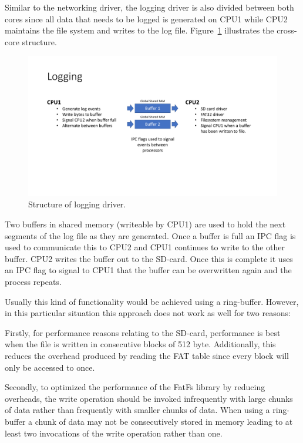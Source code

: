 Similar to the networking driver, the logging driver is also divided between both cores since all data that needs to be logged is generated on CPU1 while CPU2 maintains the file system and writes to the log file. Figure~\ref{fig:logging_structure} illustrates the cross-core structure.

\begin{figure}[H]
    \centering \includegraphics[width=1.0\textwidth]{./figures/logging_structure.pdf}
    \caption{Structure of logging driver.}
    \label{fig:logging_structure}
\end{figure}

Two buffers in shared memory (writeable by CPU1) are used to hold the next segments of the log file as they are generated. Once a buffer is full an IPC flag is used to communicate this to CPU2 and CPU1 continues to write to the other buffer. CPU2 writes the buffer out to the SD-card. Once this is complete it uses an IPC flag to signal to CPU1 that the buffer can be overwritten again and the process repeats.

Usually this kind of functionality would be achieved using a ring-buffer. However, in this particular situation this approach does not work as well for two reasons:

Firstly, for performance reasons relating to the SD-card, performance is best when the file is written in consecutive blocks of 512 byte. Additionally, this reduces the overhead produced by reading the FAT table since every block will only be accessed to once.

Secondly, to optimized the performance of the FatFs library by reducing overheads, the write operation should be invoked infrequently with large chunks of data rather than frequently with smaller chunks of data. When using a ring-buffer a chunk of data may not be consecutively stored in memory leading to at least two invocations of the write operation rather than one.

